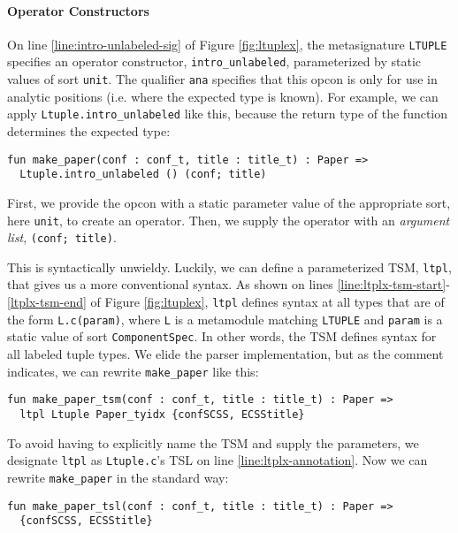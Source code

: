 \paragraph{Operator Constructors} On line \ref{line:intro-unlabeled-sig} of Figure \ref{fig:ltuplex}, the metasignature \lstinline{LTUPLE} specifies an operator constructor, \lstinline{intro_unlabeled}, parameterized by static values of sort \lstinline{unit}. The qualifier \lstinline{ana} specifies that this opcon is only for use in analytic positions (i.e. where the expected type is known). For example, we can apply \lstinline{Ltuple.intro_unlabeled} like this, because the return type of the function determines the expected type:
\begin{lstlisting}[numbers=none]
fun make_paper(conf : conf_t, title : title_t) : Paper => 
  Ltuple.intro_unlabeled () (conf; title)
\end{lstlisting}
First, we provide the opcon with a static parameter value of the appropriate sort, here \lstinline{unit}, to create an operator. Then, we supply the operator with an \emph{argument list}, \lstinline{(conf; title)}.

This is syntactically unwieldy. Luckily, we can define a parameterized TSM, \lstinline{ltpl}, that gives us a more conventional syntax. As shown on lines \ref{line:ltplx-tsm-start}-\ref{ltplx-tsm-end} of Figure \ref{fig:ltuplex}, \lstinline{ltpl} defines syntax at all types that are of the form \lstinline{L.c(param)}, where \lstinline{L} is a metamodule matching \lstinline{LTUPLE} and \lstinline{param} is a static value of sort \lstinline{ComponentSpec}. In other words, the TSM defines syntax for all labeled tuple types. We elide the parser implementation, but as the comment indicates, we can rewrite \lstinline{make_paper} like this:
\begin{lstlisting}[numbers=none]
fun make_paper_tsm(conf : conf_t, title : title_t) : Paper => 
  ltpl Ltuple Paper_tyidx {confSCSS, ECSStitle}
\end{lstlisting}

To avoid having to explicitly name the TSM and supply the parameters, we designate \lstinline{ltpl} as \lstinline{Ltuple.c}'s TSL on line \ref{line:ltplx-annotation}. Now we can rewrite \lstinline{make_paper} in the standard way:
\begin{lstlisting}[numbers=none]
fun make_paper_tsl(conf : conf_t, title : title_t) : Paper => 
  {confSCSS, ECSStitle}
\end{lstlisting}


